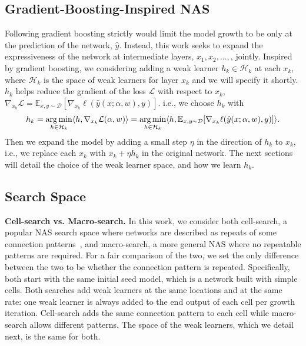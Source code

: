 \subsection{Gradient-Boosting-Inspired NAS}
\label{sec:gb_nas}
Following gradient boosting strictly would limit the model growth to be only at the prediction of the network, $\hat{y}$. 
Instead, this work seeks to expand the expressiveness of the network at intermediate layers, $x_1, x_2,...,$, jointly.
Inspired by gradient boosting, we considering adding a weak learner $h_k \in \mathcal{H}_k$ at each $x_k$, where 
$\mathcal{H}_k$ is the space of weak learners for layer $x_k$ and we will specify it shortly. 
$h_k$ helps reduce the gradient of the loss $\mathcal{L}$ with respect to $x_k$, $\nabla _{x_k} \mathcal{L}  = \mathbb{E} _{x, y \sim \mathcal{D}} [ \nabla _{x_{k}} \ell(\hat{y}(x ; \alpha, w), y) ]$.
i.e., we choose $h_k$ with 
\begin{align}
h_k = \operatorname*{arg\,min} _{h \in \mathcal{H}_k} \langle h, 
\nabla _{x_k} \mathcal{L} (\alpha, w) \rangle = 
\operatorname*{arg\,min} _{h\in \mathcal{H}_k} \langle h, \mathbb{E} _{x, y \sim \mathcal{D}} [ \nabla _{x_{k}} \ell(\hat{y}(x ; \alpha, w), y) ] \rangle.
\label{eq:hallu_objective}
\end{align}
Then we expand the model by adding a small step $\eta$ in the direction of $h_k$ to $x_k$, i.e., we replace each $x_k$ with $x_k + \eta h_k$ in the original network. 
The next sections will detail the choice of the weak learner space, and how we learn $h_k$. 

\subsection{Search Space}
\label{sec:search_space}

\textbf{Cell-search vs. Macro-search.}
In this work, we consider both cell-search, 
a popular NAS search space where networks are described as repeats of some connection patterns~\citep{NASCell,Real2018RegularizedEF,Pham2018EfficientNA,Liu2018DARTSDA}, 
and macro-search, a more general NAS where no repeatable patterns are required. 
For a fair comparison of the two, we set the only difference between the two to be whether the connection pattern is repeated. Specifically, both start with the same initial seed model, which is a network built with simple cells.
Both searches add weak learners at the same locations and at the same rate: one weak learner is always added to the end output of each cell per growth iteration.  Cell-search adds the same connection pattern to each cell while macro-search allows different patterns. 
The space of the weak learners, which we detail next, is the same for both. 



